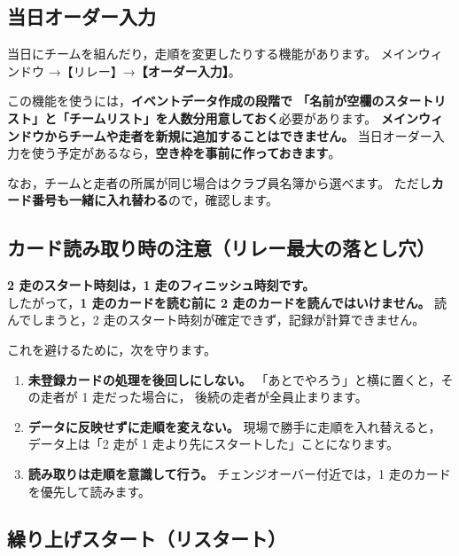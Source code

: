 \subsection*{当日オーダー入力}

当日にチームを組んだり，走順を変更したりする機能があります。
メインウィンドウ →【リレー】→\textbf{【オーダー入力】}。\ver

\begin{Note}[当日オーダー入力を使うための準備]
この機能を使うには，\textbf{イベントデータ作成の段階で
「名前が空欄のスタートリスト」と「チームリスト」を人数分用意しておく}必要があります。
\textbf{メインウィンドウからチームや走者を新規に追加することはできません。}
当日オーダー入力を使う予定があるなら，\textbf{空き枠を事前に作っておきます}。

なお，チームと走者の所属が同じ場合はクラブ員名簿から選べます。
ただし\textbf{カード番号も一緒に入れ替わる}ので，確認します。
\end{Note}

\subsection*{カード読み取り時の注意（リレー最大の落とし穴）}

\begin{Fail}
\textbf{2 走のスタート時刻は，1 走のフィニッシュ時刻です。}\\
したがって，\textbf{1 走のカードを読む前に 2 走のカードを読んではいけません。}
読んでしまうと，2 走のスタート時刻が確定できず，記録が計算できません。
\end{Fail}

これを避けるために，次を守ります。

\begin{enumerate}
\item \textbf{未登録カードの処理を後回しにしない。}
      「あとでやろう」と横に置くと，その走者が 1 走だった場合に，
      後続の走者が全員止まります。
\item \textbf{データに反映せずに走順を変えない。}
      現場で勝手に走順を入れ替えると，
      データ上は「2 走が 1 走より先にスタートした」ことになります。
\item \textbf{読み取りは走順を意識して行う。}
      チェンジオーバー付近では，1 走のカードを優先して読みます。
\end{enumerate}

\subsection*{繰り上げスタート（リスタート）}

